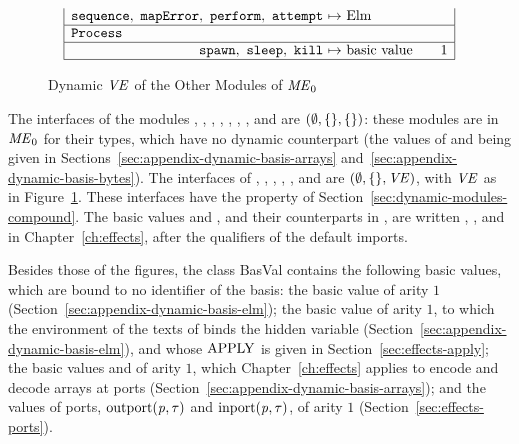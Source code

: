 \begin{figure}[htbp]
\[\begin{array}{|r@{\ }c@{\ }l@{\qquad}c|}
\kw{sequence}\citealso{b:Task.sequence},\ \kw{mapError}\citealso{b:Task.mapError},\ \kw{perform}\citealso{b:Task.perform},\ \kw{attempt}\citealso{b:Task.attempt} & \mapsto & \text{Elm} & \\
\hline
\multicolumn{4}{|l|}{\kw{Process}}\\
\hline
\kw{spawn}\citealso{b:Process.spawn},\ \kw{sleep}\citealso{b:Process.sleep},\ \kw{kill}\citealso{b:Process.kill} & \mapsto & \text{basic value} & 1\\
\hline
\end{array}
\]
\caption{Dynamic $\mathit{VE}$ of the Other Modules of $\mathit{ME}_0$}\label{fig:dynamic-basis-others}
\end{figure}

The interfaces of the modules , , ,
, , , ,
 and  are $(\emptyset,\{\},\{\})$: these
modules are in $\mathit{ME}_0$ for their types, which have no dynamic counterpart
(the values of  and  being given in
Sections~\ref{sec:appendix-dynamic-basis-arrays}
and~\ref{sec:appendix-dynamic-basis-bytes}). The interfaces of , ,
, , ,  and 
are $(\emptyset,\{\},\mathit{VE})$, with $\mathit{VE}$ as in
Figure~\ref{fig:dynamic-basis-others}. These interfaces have the property of
Section~\ref{sec:dynamic-modules-compound}. The basic values
 and
, and their counterparts in , are written
, ,  and  in
Chapter~\ref{ch:effects}, after the qualifiers of the default imports.

Besides those of the figures, the class BasVal contains the following basic
values, which are bound to no identifier of the basis: the basic value
 of arity $1$
(Section~\ref{sec:appendix-dynamic-basis-elm}); the basic value
 of arity $1$, to which the environment of the texts of
 binds the hidden variable 
(Section~\ref{sec:appendix-dynamic-basis-elm}), and whose $\mathrm{APPLY}$ is given in
Section~\ref{sec:effects-apply}; the basic values
 and  of arity $1$, which
Chapter~\ref{ch:effects} applies to encode and decode arrays at ports
(Section~\ref{sec:appendix-dynamic-basis-arrays}); and the values of ports,
$\mathrm{outport}(\mathit{p},\tau)$ and $\mathrm{inport}(\mathit{p},\tau)$, of arity $1$
(Section~\ref{sec:effects-ports}).

